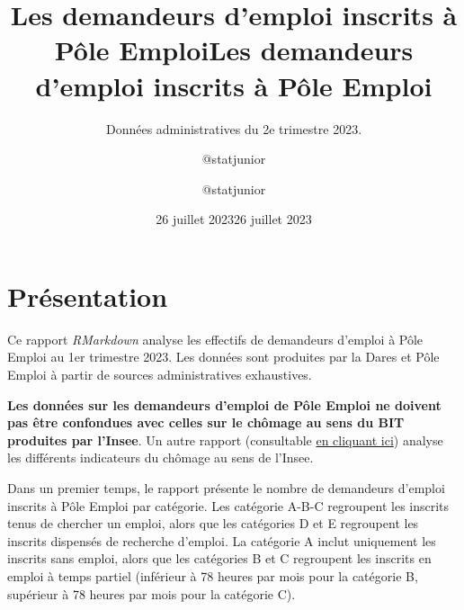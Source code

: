 \documentclass[
  paper=a4,
  ,captions=tableheading
]{scrartcl}
\title{Les demandeurs d'emploi inscrits à Pôle Emploi}
\subtitle{Données administratives du 2e trimestre 2023.}
\author{@statjunior}
\date{26 juillet 2023}
\title{Les demandeurs d'emploi inscrits à Pôle Emploi}
\author{@statjunior}
\date{26 juillet 2023}
\begin{document}
\begin{titlepage}
\afterpage{\restorepagecolor}
\newcommand{\colorRule}[3][black]{\textcolor[HTML]{#1}{\rule{#2}{#3}}}
\end{titlepage}
\restoregeometry
{} 




\hypertarget{pruxe9sentation}{%
\section{Présentation}\label{pruxe9sentation}}

Ce rapport \emph{RMarkdown} analyse les effectifs de demandeurs d'emploi
à Pôle Emploi au 1er trimestre 2023. Les données sont produites par la
Dares et Pôle Emploi à partir de sources administratives exhaustives.

\textbf{Les données sur les demandeurs d'emploi de Pôle Emploi ne
doivent pas être confondues avec celles sur le chômage au sens du BIT
produites par l'Insee}. Un autre rapport (consultable
\href{https://github.com/statjunior/Statjunior/tree/main/Conjoncture\%20-\%20comptes\%20trimestriels/}{en
cliquant ici}) analyse les différents indicateurs du chômage au sens de
l'Insee.

Dans un premier temps, le rapport présente le nombre de demandeurs
d'emploi inscrits à Pôle Emploi par catégorie. Les catégorie A-B-C
regroupent les inscrits tenus de chercher un emploi, alors que les
catégories D et E regroupent les inscrits dispensés de recherche
d'emploi. La catégorie A inclut uniquement les inscrits sans emploi,
alors que les catégories B et C regroupent les inscrits en emploi à
temps partiel (inférieur à 78 heures par mois pour la catégorie B,
supérieur à 78 heures par mois pour la catégorie C).
\end{document}

